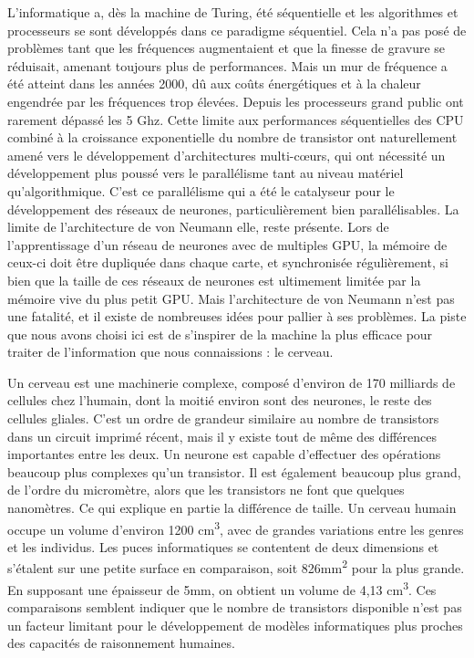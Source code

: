 	L'informatique a, dès la machine de Turing, été séquentielle et les algorithmes et processeurs se sont développés dans ce paradigme séquentiel. Cela n'a pas posé de problèmes tant que les fréquences augmentaient et que la finesse de gravure se réduisait, amenant toujours plus de performances. Mais un mur de fréquence a été atteint dans les années 2000, dû aux coûts énergétiques et à la chaleur engendrée par les fréquences trop élevées. Depuis les processeurs grand public ont rarement dépassé les 5 Ghz. Cette limite aux performances séquentielles des CPU combiné à la croissance exponentielle du nombre de transistor ont naturellement amené vers le développement d'architectures multi-cœurs, qui ont nécessité un développement plus poussé vers le parallélisme tant au niveau matériel qu'algorithmique. C'est ce parallélisme qui a été le catalyseur pour le développement des réseaux de neurones, particulièrement bien parallélisables. La limite de l'architecture de von Neumann elle, reste présente. Lors de l'apprentissage d'un réseau de neurones avec de multiples GPU, la mémoire de ceux-ci doit être dupliquée dans chaque carte, et synchronisée régulièrement, si bien que la taille de ces réseaux de neurones est ultimement limitée par la mémoire vive du plus petit GPU. Mais l'architecture de von Neumann n'est pas une fatalité, et il existe de nombreuses idées pour pallier à ses problèmes. La piste que nous avons choisi ici est de s'inspirer de la machine la plus efficace pour traiter de l'information que nous connaissions : le cerveau.

	Un cerveau est une machinerie complexe, composé d'environ de 170 milliards de cellules chez l'humain, dont la moitié environ sont des neurones, le reste des cellules gliales. C'est un ordre de grandeur similaire au nombre de transistors dans un circuit imprimé récent, mais il y existe tout de même des différences importantes entre les deux. Un neurone est capable d'effectuer des opérations beaucoup plus complexes qu'un transistor. Il est également beaucoup plus grand, de l'ordre du micromètre, alors que les transistors ne font que quelques nanomètres. Ce qui explique en partie la différence de taille. Un cerveau humain occupe un volume d'environ 1200 cm\textsuperscript{3}, avec de grandes variations entre les genres et les individus. Les puces informatiques se contentent de deux dimensions et s'étalent sur une petite surface en comparaison, soit 826mm\textsuperscript{2} pour la plus grande. En supposant une épaisseur de 5mm, on obtient un volume de 4,13 cm\textsuperscript{3}. Ces comparaisons semblent indiquer que le nombre de transistors disponible n'est pas un facteur limitant pour le développement de modèles informatiques plus proches des capacités de raisonnement humaines.

